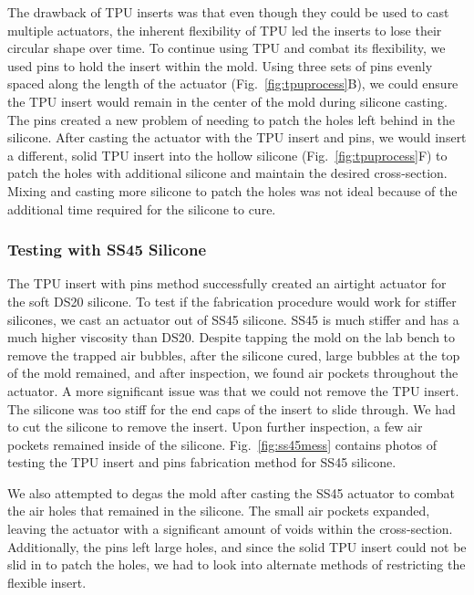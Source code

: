 The drawback of TPU inserts was that even though they could be used to cast multiple actuators, the inherent flexibility of TPU led the inserts to lose their circular shape over time. To continue using TPU and combat its flexibility, we used pins to hold the insert within the mold. Using three sets of pins evenly spaced along the length of the actuator (Fig.~\ref{fig:tpuprocess}B), we could ensure the TPU insert would remain in the center of the mold during silicone casting. The pins created a new problem of needing to patch the holes left behind in the silicone. After casting the actuator with the TPU insert and pins, we would insert a different, solid TPU insert into the hollow silicone (Fig.~\ref{fig:tpuprocess}F) to patch the holes with additional silicone and maintain the desired cross-section. Mixing and casting more silicone to patch the holes was not ideal because of the additional time required for the silicone to cure. 

\subsubsection{Testing with SS45 Silicone}

The TPU insert with pins method successfully created an airtight actuator for the soft DS20 silicone. To test if the fabrication procedure would work for stiffer silicones, we cast an actuator out of SS45 silicone. SS45 is much stiffer and has a much higher viscosity than DS20. Despite tapping the mold on the lab bench to remove the trapped air bubbles, after the silicone cured, large bubbles at the top of the mold remained, and after inspection, we found air pockets throughout the actuator. A more significant issue was that we could not remove the TPU insert. The silicone was too stiff for the end caps of the insert to slide through. We had to cut the silicone to remove the insert. Upon further inspection, a few air pockets remained inside of the silicone. Fig.~\ref{fig:ss45mess} contains photos of testing the TPU insert and pins fabrication method for SS45 silicone. 

We also attempted to degas the mold after casting the SS45 actuator to combat the air holes that remained in the silicone. The small air pockets expanded, leaving the actuator with a significant amount of voids within the cross-section. Additionally, the pins left large holes, and since the solid TPU insert could not be slid in to patch the holes, we had to look into alternate methods of restricting the flexible insert. \\

